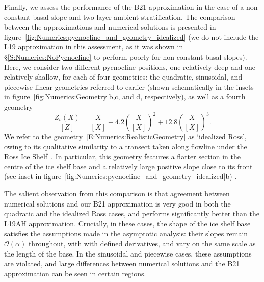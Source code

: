 \documentclass{jfm}
\newcommand{\order}[1]{\mathcal{O}(#1)}
\begin{document}
Finally, we assess the performance of the B21 approximation in the case of a non-constant basal slope and two-layer ambient stratification. The comparison between the approximations and numerical solutions is presented in figure~\ref{fig:Numerics:pycnocline_and_geometry_idealized} (we do not include the L19 approximation in this assessment, as it was shown in \S\ref{S:Numerics:NoPycnocline} to perform poorly for non-constant basal slopes). Here, we consider two different pycnocline positions, one relatively deep and one relatively shallow, for each of four geometries: the quadratic, sinusoidal, and piecewise linear geometries referred to earlier (shown schematically in the insets in figure~\ref{fig:Numerics:Geometry}b,c, and d, respectively), as well as a fourth geometry 
\begin{equation}\label{E:Numerics:RealisticGeometry}
\frac{Z_b(X)}{\left[Z\right]}= \frac{X}{\left[X\right]} -4.2\left(\frac{X}{\left[X\right]}\right)^2 + 12.8\left(\frac{X}{\left[X\right]}\right)^3.
\end{equation}
We refer to the geometry~\eqref{E:Numerics:RealisticGeometry} as `idealized Ross', owing to its qualitative similarity to a transect taken along flowline under the Ross Ice Shelf~\citep{Shabtaie1987JGeophysResSolidEarth}. In particular, this geometry features a flatter section in the centre of the ice shelf base and a relatively large positive slope close to its front (see inset in figure~\ref{fig:Numerics:pycnocline_and_geometry_idealized}b) .

The salient observation from this comparison is that agreement between numerical solutions and our B21 approximation is very good in both the quadratic and the idealized Ross cases, and performs significantly better than the L19AH approximation. Crucially, in these cases, the shape of the ice shelf base satisfies the assumptions made in the asymptotic analysis: their slopes remain $\order{\alpha}$ throughout, with with defined derivatives, and vary on the same scale as the length of the base. In the sinusoidal and piecewise cases, these assumptions are violated, and large differences between numerical solutions and the B21 approximation can be seen in certain regions.
\end{document}
